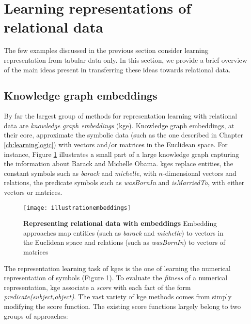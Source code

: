 \section{Learning representations of relational data}


The few examples discussed in the previous section consider learning representation from tabular data only.
In this section, we provide a brief overview of the main ideas present in transferring these ideas towards relational data.


\subsection{Knowledge graph embeddings}


By far the largest group of methods for representation learning with relational data are \textit{knowledge graph embeddings} (\gls{kge}).
Knowledge graph embeddings, at their core, approximate the symbolic data (such as the one described in Chapter \ref{ch:learninglogic}) with vectors and/or matrices in the Euclidean space.
For instance, Figure \ref{fig:emb} illustrates a small part of a large knowledge graph capturing the information about Barack and Michelle Obama.
\gls{kge}s replace entities, the constant symbols such as \textit{barack} and \textit{michelle}, with $n$-dimensional vectors and relations, the predicate symbols such as \textit{wasBornIn} and \textit{isMarriedTo}, with either vectors or matrices.

 \begin{figure}
	\centering
	\texttt{[image: illustrationembeddings]}
	\caption[Representing relational data with embeddings]{\textbf{Representing relational data with embeddings} Embedding approaches map entities (such as \textit{barack} and \textit{michelle}) to vectors in the Euclidean space and relations (such as \textit{wasBornIn}) to vectors of matrices}
	\label{fig:emb}
\end{figure}




The representation learning task of \gls{kge}s is the one of learning the numerical representation of symbols (Figure \ref{fig:emb}).
To evaluate the \textit{fitness} of a numerical representation, \gls{kge} associate a \textit{score} with each fact of the form \textit{predicate(subject,object)}.
The vast variety of \gls{kge} methods comes from simply modifying the score function.
The existing score functions largely belong to two groups of approaches:

